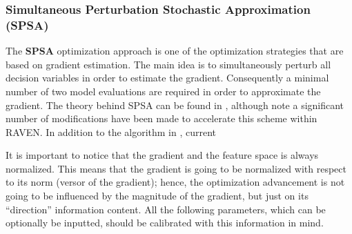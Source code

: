 \subsubsection{Simultaneous Perturbation Stochastic Approximation (SPSA)}
\label{subsubsubsec:SPSA}
The \textbf{SPSA} optimization approach is one of the optimization strategies that are based on gradient estimation. The main
idea is to simultaneously perturb all decision variables in order to estimate the gradient. Consequently a minimal number of two
model evaluations are required in order to approximate the gradient. The theory behind SPSA can be found in
\cite{spall1998implementation}, although note a significant number of modifications have been made to
accelerate this scheme within RAVEN.
In addition to the algorithm in \cite{spall1998implementation}, current 

It is important to notice that the gradient and the feature space is always normalized. This means that the gradient is going to be
normalized with respect to its norm (versor of the gradient); hence, the optimization advancement is not going to be influenced by the
magnitude of the gradient, but just on its ``direction'' information content. All the following parameters, which can be optionally be inputted, should be calibrated with this information in mind.
%

